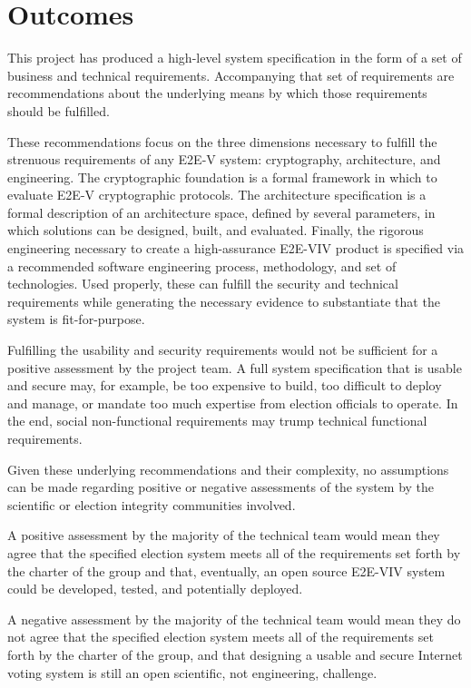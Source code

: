 \section{Outcomes}
\label{sec:outcomes}

This project has produced a high-level system specification in the
form of a set of business and technical requirements. Accompanying
that set of requirements are recommendations about the underlying
means by which those requirements should be fulfilled.

These recommendations focus on the three dimensions necessary to
fulfill the strenuous requirements of any E2E-V system: cryptography,
architecture, and engineering. The cryptographic foundation is a
formal framework in which to evaluate E2E-V cryptographic
protocols. The architecture specification is a formal description of
an architecture space, defined by several parameters, in which
solutions can be designed, built, and evaluated. Finally, the rigorous
engineering necessary to create a high-assurance E2E-VIV product is
specified via a recommended software engineering process, methodology,
and set of technologies. Used properly, these can fulfill the security
and technical requirements while generating the necessary evidence to
substantiate that the system is fit-for-purpose.

Fulfilling the usability and security requirements would not be
sufficient for a positive assessment by the project team. A full
system specification that is usable and secure may, for example, be
too expensive to build, too difficult to deploy and manage, or mandate
too much expertise from election officials to operate. In the end,
social non-functional requirements may trump technical functional
requirements. 

Given these underlying recommendations and their complexity, no
assumptions can be made regarding positive or negative assessments of
the system by the scientific or election integrity communities
involved. 

A positive assessment by the majority of the technical team would mean
they agree that the specified election system meets all of the
requirements set forth by the charter of the group and that,
eventually, an open source E2E-VIV system could be developed, tested,
and potentially deployed.

A negative assessment by the majority of the technical team would mean
they do not agree that the specified election system meets all of the
requirements set forth by the charter of the group, and that designing
a usable and secure Internet voting system is still an open
scientific, not engineering, challenge.

